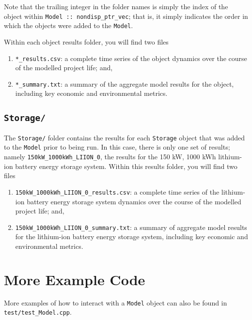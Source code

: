 \documentclass[12pt, letterpaper]{report}
\begin{document}
\noindent Note that the trailing integer in the folder names is simply the index of the object within \texttt{Model :: nondisp\_ptr\_vec}; that is, it simply indicates the order in which the objects were added to the \texttt{Model}.\par 
Within each object results folder, you will find two files

\begin{enumerate}
    \item \texttt{*\_results.csv}: a complete time series of the object dynamics over the course of the modelled project life; and,
    \item \texttt{*\_summary.txt}: a summary of the aggregate model results for the object, including key economic and environmental metrics.
\end{enumerate}

\subsection{\texttt{Storage/}}

The \texttt{Storage/} folder contains the results for each \texttt{Storage} object that was added to the \texttt{Model} prior to being run. In this case, there is only one set of results; namely \texttt{150kW\_1000kWh\_LIION\_0}, the results for the 150 kW, 1000 kWh lithium-ion battery energy storage system. Within this results folder, you will find two files

\begin{enumerate}
    \item \texttt{150kW\_1000kWh\_LIION\_0\_results.csv}: a complete time series of the lithium-ion battery energy storage system dynamics over the course of the modelled project life; and,
    \item \texttt{150kW\_1000kWh\_LIION\_0\_summary.txt}: a summary of aggregate model results for the lithium-ion battery energy storage system, including key economic and environmental metrics.
\end{enumerate}

\section{More Example Code}

More examples of how to interact with a \texttt{Model} object can also be found in\\\texttt{test/test\_Model.cpp}.


% 
% 




\end{document}
